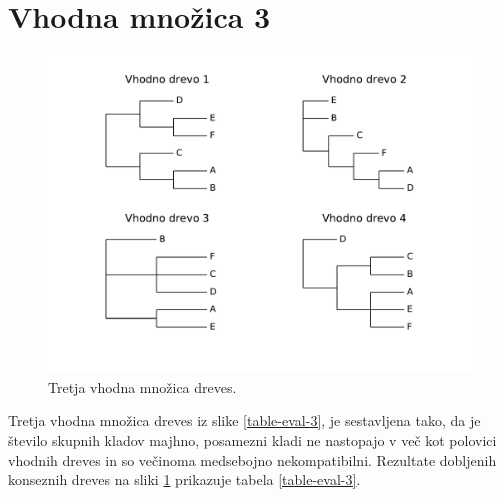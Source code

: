 \documentclass[a4paper, 12pt]{book}
\begin{document}
\section{Vhodna množica 3}
\begin{figure}[h!]
	\begin{center}
		\includegraphics[scale=0.63, clip=true, trim=0 2cm 0 0.5cm]{gfx/eval_input_3.pdf}
	\end{center}
	\caption{Tretja vhodna množica dreves.}
	\label{img-eval-input-3}
\end{figure}

Tretja vhodna množica dreves iz slike \ref{table-eval-3}, je sestavljena tako, da je število skupnih kladov majhno, 
posamezni kladi ne nastopajo v več kot polovici vhodnih dreves in so večinoma medsebojno nekompatibilni. Rezultate
dobljenih konseznih dreves na sliki \ref{img-eval-input-3} prikazuje tabela \ref{table-eval-3}.
\end{document}
